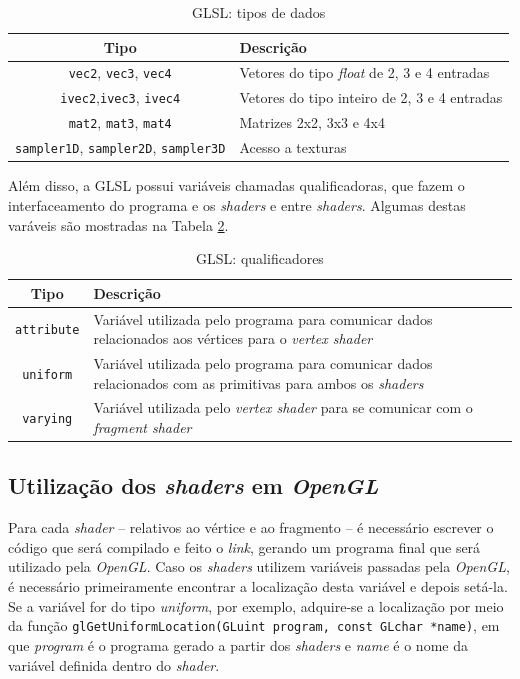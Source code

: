 \begin{table}[ht]
	\centering	
	\begin{tabularx}{0.9\textwidth}{cX}
		\toprule
		\textbf{Tipo} & \textbf{Descrição}  \\
		\midrule
		\texttt{vec2}, \texttt{vec3}, \texttt{vec4} & Vetores do tipo \textit{float} de 2, 3 e 4 entradas \\
		\texttt{ivec2},\texttt{ivec3}, \texttt{ivec4} & Vetores do tipo inteiro de 2, 3 e 4 entradas \\
		\texttt{mat2}, \texttt{mat3}, \texttt{mat4} & Matrizes 2x2, 3x3 e 4x4 \\
		\texttt{sampler1D}, \texttt{sampler2D}, \texttt{sampler3D} & Acesso a texturas \\
		\bottomrule
	\end{tabularx}
	\caption{ GLSL: tipos de dados}
	\label{tiposglsl}
\end{table}

	Além disso, a GLSL possui variáveis chamadas qualificadoras, que fazem o interfaceamento do programa e os \textit{shaders} e entre \textit{shaders}. Algumas destas varáveis são mostradas na Tabela \ref{tiposqualificadores}.

	\begin{table}[ht]
	\centering	
	\begin{tabularx}{0.9\textwidth}{cX}
		\toprule
		\textbf{Tipo} & \textbf{Descrição}  \\
		\midrule
		\texttt{attribute} &  Variável utilizada pelo programa para comunicar dados relacionados aos vértices para o \textit{vertex shader}\\
		\texttt{uniform} &  Variável utilizada pelo programa para comunicar dados relacionados com as primitivas para ambos os \textit{shaders} \\
		\texttt{varying} &  Variável utilizada pelo \textit{vertex shader} para se comunicar com o \textit{fragment shader} \\
		\bottomrule
	\end{tabularx}
	\caption{ GLSL: qualificadores}
	\label{tiposqualificadores}
	\end{table}

\subsection{Utilização dos \textit{shaders} em \textit{OpenGL}}

	Para cada \textit{shader} -- relativos ao vértice e ao fragmento -- é necessário escrever o código que será compilado e feito o \textit{link}, gerando um programa final que será utilizado pela \textit{OpenGL}. Caso os \textit{shaders} utilizem variáveis passadas pela \textit{OpenGL}, é necessário primeiramente encontrar a localização desta variável e depois setá-la. Se a variável for do tipo \textit{uniform}, por exemplo, adquire-se a localização por meio da função \texttt{glGetUniformLocation(GLuint program, const GLchar *name)}, em que \textit{program} é o programa gerado a partir dos \textit{shaders} e \textit{name} é o nome da variável definida dentro do \textit{shader}. 

